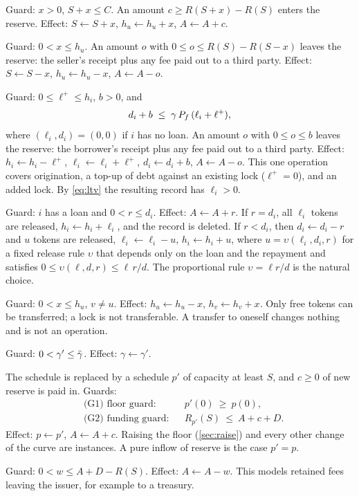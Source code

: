 \begin{description}[leftmargin=1.2em,itemsep=3pt]
\item[\op{Buy}$(u,x)$.] Guard: $x>0$, $S+x\le C$. An amount $c\ge R(S+x)-R(S)$ enters the reserve. Effect: $S\gets S+x$, $h_u\gets h_u+x$, $A\gets A+c$.
\item[\op{Sell}$(u,x)$.] Guard: $0<x\le h_u$. An amount $o$ with $0\le o\le R(S)-R(S-x)$ leaves the reserve: the seller's receipt plus any fee paid out to a third party. Effect: $S\gets S-x$, $h_u\gets h_u-x$, $A\gets A-o$.
\item[\op{Borrow}$(i,\ell^+,b)$.] Guard: $0\le \ell^+\le h_i$, $b>0$, and
\begin{equation}\label{eq:ltv}
d_i+b\;\le\;\gamma\,P_f\,(\ell_i+\ell^+),
\end{equation}
where $(\ell_i,d_i)=(0,0)$ if $i$ has no loan. An amount $o$ with $0\le o\le b$ leaves the reserve: the borrower's receipt plus any fee paid out to a third party. Effect: $h_i\gets h_i-\ell^+$, $\ell_i\gets \ell_i+\ell^+$, $d_i\gets d_i+b$, $A\gets A-o$. This one operation covers origination, a top-up of debt against an existing lock ($\ell^+=0$), and an added lock. By \eqref{eq:ltv} the resulting record has $\ell_i>0$.
\item[\op{Repay}$(i,r)$.] Guard: $i$ has a loan and $0<r\le d_i$. Effect: $A\gets A+r$. If $r=d_i$, all $\ell_i$ tokens are released, $h_i\gets h_i+\ell_i$, and the record is deleted. If $r<d_i$, then $d_i\gets d_i-r$ and $u$ tokens are released, $\ell_i\gets\ell_i-u$, $h_i\gets h_i+u$, where $u=\upsilon(\ell_i,d_i,r)$ for a fixed release rule $\upsilon$ that depends only on the loan and the repayment and satisfies $0\le\upsilon(\ell,d,r)\le \ell\,r/d$. The proportional rule $\upsilon=\ell r/d$ is the natural choice.
\item[\op{Transfer}$(u,v,x)$.] Guard: $0<x\le h_u$, $v\ne u$. Effect: $h_u\gets h_u-x$, $h_v\gets h_v+x$. Only free tokens can be transferred; a lock is not transferable. A transfer to oneself changes nothing and is not an operation.
\item[\op{SetLTV}$(\gamma')$.] Guard: $0<\gamma'\le\bar\gamma$. Effect: $\gamma\gets\gamma'$.
\item[\op{Reshape}$(p',c)$.] The schedule is replaced by a schedule $p'$ of capacity at least $S$, and $c\ge0$ of new reserve is paid in. Guards:
\begin{align}
&\text{(G1) floor guard:} && p'(0)\ \ge\ p(0), \label{eq:G1}\\
&\text{(G2) funding guard:} && R_{p'}(S)\ \le\ A+c+D. \label{eq:G2}
\end{align}
Effect: $p\gets p'$, $A\gets A+c$. Raising the floor (\cref{sec:raise}) and every other change of the curve are instances. A pure inflow of reserve is the case $p'=p$.
\item[\op{Skim}$(w)$.] Guard: $0<w\le A+D-R(S)$. Effect: $A\gets A-w$. This models retained fees leaving the issuer, for example to a treasury.
\end{description}

